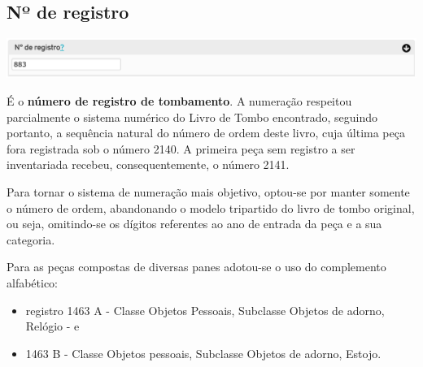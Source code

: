 \subsection{Nº de registro}
\begin{flushleft}
	\includegraphics[width=\linewidth]{elemento-01}
\end{flushleft}
É o \textbf{número de registro de tombamento}. A numeração respeitou parcialmente o sistema numérico do Livro de Tombo encontrado, seguindo portanto, a sequência natural do número de ordem deste livro, cuja última peça fora registrada sob o número 2140. A primeira peça sem registro a ser inventariada recebeu, consequentemente, o número 2141.

Para tornar o sistema de numeração mais objetivo, optou-se por manter somente o número de ordem, abandonando o modelo tripartido do livro de tombo original, ou seja, omitindo-se os dígitos referentes ao ano de entrada da peça e a sua categoria. 

Para as peças compostas de diversas panes adotou-se o uso do complemento alfabético:

\begin{itemize}
	\item registro 1463 A - Classe Objetos Pessoais, Subclasse Objetos de adorno, Relógio - e 
	\item 1463 B - Classe Objetos pessoais, Subclasse Objetos de adorno, Estojo.
\end{itemize}

